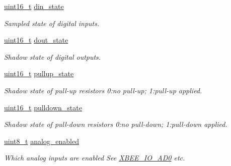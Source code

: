 \begin{DoxyCompactItemize}
\mbox{\label{group__xbee__io_gaef89a704cd7723b8bac1e3f6f1abd71f}} 
\hyperlink{group__hal__dos_ga5a8b2dc9e45a9ee81a94ef304fb62505}{uint16\+\_\+t} \hyperlink{group__xbee__io_gaef89a704cd7723b8bac1e3f6f1abd71f}{din\+\_\+state}
\begin{DoxyCompactList}\small\item\em Sampled state of digital inputs. \end{DoxyCompactList}\item 
\mbox{\label{group__xbee__io_gafffe3ca8d9c16b73247ec851e1c263ca}} 
\hyperlink{group__hal__dos_ga5a8b2dc9e45a9ee81a94ef304fb62505}{uint16\+\_\+t} \hyperlink{group__xbee__io_gafffe3ca8d9c16b73247ec851e1c263ca}{dout\+\_\+state}
\begin{DoxyCompactList}\small\item\em Shadow state of digital outputs. \end{DoxyCompactList}\item 
\mbox{\label{group__xbee__io_gae74f9326ff51e03bd7ae5d2c85c08f9e}} 
\hyperlink{group__hal__dos_ga5a8b2dc9e45a9ee81a94ef304fb62505}{uint16\+\_\+t} \hyperlink{group__xbee__io_gae74f9326ff51e03bd7ae5d2c85c08f9e}{pullup\+\_\+state}
\begin{DoxyCompactList}\small\item\em Shadow state of pull-\/up resistors 0\+:no pull-\/up; 1\+:pull-\/up applied. \end{DoxyCompactList}\item 
\mbox{\label{group__xbee__io_gab7b8b762841906ebf44fe90a3194d20c}} 
\hyperlink{group__hal__dos_ga5a8b2dc9e45a9ee81a94ef304fb62505}{uint16\+\_\+t} \hyperlink{group__xbee__io_gab7b8b762841906ebf44fe90a3194d20c}{pulldown\+\_\+state}
\begin{DoxyCompactList}\small\item\em Shadow state of pull-\/down resistors 0\+:no pull-\/down; 1\+:pull-\/down applied. \end{DoxyCompactList}\item 
\hyperlink{group__hal__dos_gae1affc9ca37cfb624959c866a73f83c2}{uint8\+\_\+t} \hyperlink{group__xbee__io_ga8473837f97f54ee29f09cd8f9c15e084}{analog\+\_\+enabled}
\begin{DoxyCompactList}\small\item\em Which analog inputs are enabled See \hyperlink{group__xbee__io_gafc56816e62b0dd0a8d981b08f5f29651}{X\+B\+E\+E\+\_\+\+I\+O\+\_\+\+A\+D0} etc. \end{DoxyCompactList}\item 

\end{DoxyCompactItemize}
